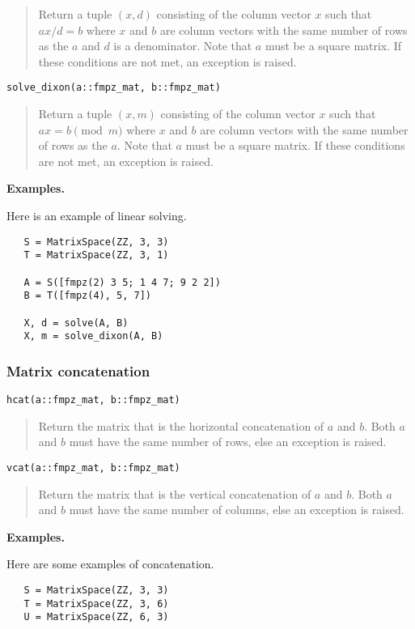 \documentclass[a4paper,10pt]{article}
\newcommand{\desc}[1]{\vspace{-3mm}\begin{quote}#1\end{quote}}
\begin{document}
{{\desc{Return a tuple $(x, d)$ consisting of the column vector $x$ such that $ax/d = b$
where $x$ and $b$ are column vectors with the same number of rows as the $a$ and $d$ is
a denominator. Note that $a$ must be a square matrix. If these conditions are not met,
an exception is raised.}

\begin{lstlisting}
solve_dixon(a::fmpz_mat, b::fmpz_mat)
\end{lstlisting}

\desc{Return a tuple $(x, m)$ consisting of the column vector $x$ such that
$ax = b \pmod{m}$ where $x$ and $b$ are column vectors with the same number of rows as
the $a$. Note that $a$ must be a square matrix. If these conditions are not met, an
exception is raised.}

\textbf{Examples.}

Here is an example of linear solving.

\begin{lstlisting}
   S = MatrixSpace(ZZ, 3, 3)
   T = MatrixSpace(ZZ, 3, 1)

   A = S([fmpz(2) 3 5; 1 4 7; 9 2 2])   
   B = T([fmpz(4), 5, 7])

   X, d = solve(A, B)
   X, m = solve_dixon(A, B)
\end{lstlisting}

\subsubsection{Matrix concatenation}

\begin{lstlisting}
hcat(a::fmpz_mat, b::fmpz_mat)
\end{lstlisting}

\desc{Return the matrix that is the horizontal concatenation of $a$ and $b$.
Both $a$ and $b$ must have the same number of rows, else an exception is raised.}

\begin{lstlisting}
vcat(a::fmpz_mat, b::fmpz_mat)
\end{lstlisting}

\desc{Return the matrix that is the vertical concatenation of $a$ and $b$.
Both $a$ and $b$ must have the same number of columns, else an exception is raised.}

\textbf{Examples.}

Here are some examples of concatenation.

\begin{lstlisting}
   S = MatrixSpace(ZZ, 3, 3)
   T = MatrixSpace(ZZ, 3, 6)
   U = MatrixSpace(ZZ, 6, 3)


\end{lstlisting}}}
\end{document}
